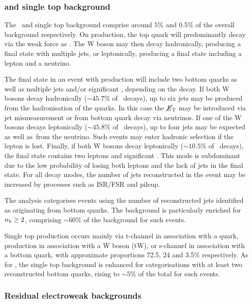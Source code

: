\subsubsection{\ttj and single top background}
The \ttj~and single top background comprise around $5\%$ and 0.5\% of the overall
background respectively. On production, the top quark will predominantly decay via the 
weak force as \twb. The W boson may then decay hadronically, producing a final state
with multiple jets, or leptonically, producing a final state including a lepton and a neutrino. 

The final state in an event with \ttj production will include two bottom quarks as well as multiple 
jets and/or significant \met, depending on the decay. If both W bosons decay hadronically ($\sim45.7\%$ of \ttbar~decays),
up to six jets may be produced from the hadronisation of the quarks. In this case the $\mbox{$\cancel{E}_\text{T}$}$
may be introduced via jet mismeasurement or from bottom quark decay via neutrinos. If one of the 
W bosons decays leptonically ($\sim45.8\%$ of \ttbar~decays), up to four jets may be expected
as well as~\met from the neutrino. Such events may enter hadronic selection if the lepton is lost.
Finally, if both W bosons decay leptonically ($\sim10.5\%$ of \ttbar~decays), the final state contains two 
leptons and significant \met. This mode is subdominant due to the low probability of losing both leptons
and the lack of jets in the final state. For all decay modes, the number of jets reconstructed in the event
may be increased by processes such as ISR/FSR and pileup.

The \alphat analysis categorises events using the number of reconstructed 
jets identified as originating from bottom quarks. The \ttbar background is particularly
enriched for $n_{\mathrm{b}} \ge 2$, comprising $\sim60\%$ of the background for such events.

Single top production occurs mainly via t-channel in association with a quark, production in 
association with a W boson (tW), or s-channel in association with a bottom quark, with approximate
proportions 72.5, 24 and 3.5\% respectively. As for \ttj, the single top background is enhanced for 
categorisations with at least two reconstructed bottom quarks, rising to $\sim5\%$ of the total for
such events.

\subsubsection{Residual electroweak backgrounds}

